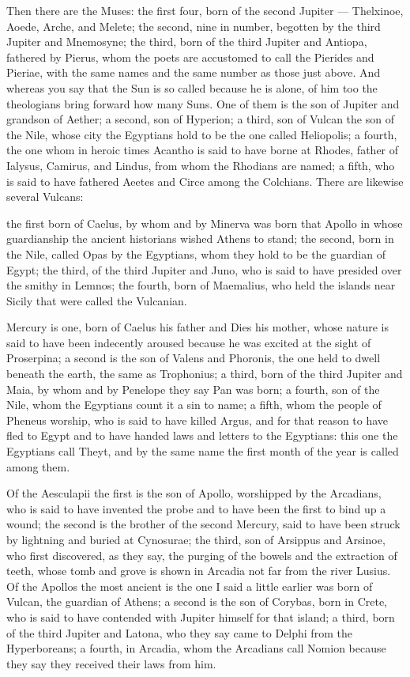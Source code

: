  Then there are the Muses: the first four, born of the second Jupiter — Thelxinoe, Aoede, Arche, and Melete; the second, nine in number, begotten by the third Jupiter and Mnemosyne; the third, born of the third Jupiter and Antiopa, fathered by Pierus, whom the poets are accustomed to call the Pierides and Pieriae, with the same names and the same number as those just above. And whereas you say that the Sun is so called because he is alone, of him too the theologians bring forward how many Suns. One of them is the son of Jupiter and grandson of Aether; a second, son of Hyperion; a third, son of Vulcan the son of the Nile, whose city the Egyptians hold to be the one called Heliopolis; a fourth, the one whom in heroic times Acantho is said to have borne at Rhodes, father of Ialysus, Camirus, and Lindus, from whom the Rhodians are named; a fifth, who is said to have fathered Aeetes and Circe among the Colchians. There are likewise several Vulcans:

 the first born of Caelus, by whom and by Minerva was born that Apollo in whose guardianship the ancient historians wished Athens to stand; the second, born in the Nile, called Opas by the Egyptians, whom they hold to be the guardian of Egypt; the third, of the third Jupiter and Juno, who is said to have presided over the smithy in Lemnos; the fourth, born of Maemalius, who held the islands near Sicily that were called the Vulcanian.

 Mercury is one, born of Caelus his father and Dies his mother, whose nature is said to have been indecently aroused because he was excited at the sight of Proserpina; a second is the son of Valens and Phoronis, the one held to dwell beneath the earth, the same as Trophonius; a third, born of the third Jupiter and Maia, by whom and by Penelope they say Pan was born; a fourth, son of the Nile, whom the Egyptians count it a sin to name; a fifth, whom the people of Pheneus worship, who is said to have killed Argus, and for that reason to have fled to Egypt and to have handed laws and letters to the Egyptians: this one the Egyptians call Theyt, and by the same name the first month of the year is called among them.

 Of the Aesculapii the first is the son of Apollo, worshipped by the Arcadians, who is said to have invented the probe and to have been the first to bind up a wound; the second is the brother of the second Mercury, said to have been struck by lightning and buried at Cynosurae; the third, son of Arsippus and Arsinoe, who first discovered, as they say, the purging of the bowels and the extraction of teeth, whose tomb and grove is shown in Arcadia not far from the river Lusius. Of the Apollos the most ancient is the one I said a little earlier was born of Vulcan, the guardian of Athens; a second is the son of Corybas, born in Crete, who is said to have contended with Jupiter himself for that island; a third, born of the third Jupiter and Latona, who they say came to Delphi from the Hyperboreans; a fourth, in Arcadia, whom the Arcadians call Nomion because they say they received their laws from him.

